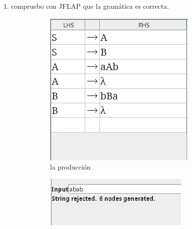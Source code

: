 \documentclass{article}
\begin{document}
\begin{flushleft}
\begin{enumerate}
                \item compruebo con JFLAP que la gramática es correcta.
                \begin{figure}[h] 
                    \centering
                    \begin{subfigure}[b]{0.25\textwidth}
                        \centering
                        \includegraphics[width=\textwidth]{./Imagenes/produccion4.png}
                        \caption{la producción}
                        \label{fig:label14}
                    \end{subfigure}
                    \hfill
                    \begin{subfigure}[b]{0.4\textwidth}
                        \centering
                        \includegraphics[width=\textwidth]{./Imagenes/grafoabab.png}

\end{subfigure}
\end{figure}
\end{enumerate}
\end{flushleft}
\end{document}
